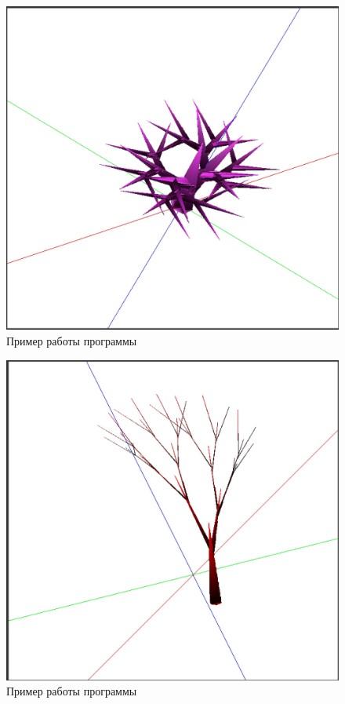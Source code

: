 \documentclass[54pt, a4paper]{article}
\begin{document}
	\newpage

	\begin{figure}[ht!]
		\centering
		\includegraphics[scale=0.2]{img/ex3.JPG}
		\caption{Пример работы программы}
		\label{ris:ex3}
	\end{figure}

	\begin{figure}[ht!]
		\centering
		\includegraphics[scale=0.2]{img/ex4.JPG}
		\caption{Пример работы программы}
		\label{ris:ex4}
	\end{figure}
\end{document}
